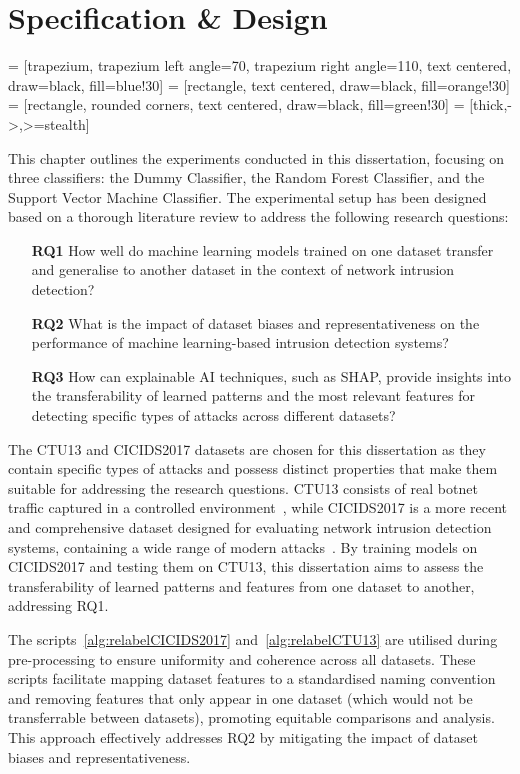 \chapter{Specification \& Design}\label{chap:specification-design}

 = [trapezium, trapezium left angle=70, trapezium right angle=110, text centered, draw=black, fill=blue!30]
 = [rectangle, text centered, draw=black, fill=orange!30]
 = [rectangle, rounded corners, text centered, draw=black, fill=green!30]
 = [thick,->,>=stealth]

This chapter outlines the experiments conducted in this dissertation, focusing on three classifiers: the Dummy Classifier, the Random Forest Classifier, and the Support Vector Machine Classifier. The experimental setup has been designed based on a thorough literature review to address the following research questions:

\begin{enumerate}
\item[\textbf{RQ1}] How well do machine learning models trained on one dataset transfer and generalise to another dataset in the context of network intrusion detection?
\item[\textbf{RQ2}] What is the impact of dataset biases and representativeness on the performance of machine learning-based intrusion detection systems?
\item[\textbf{RQ3}] How can explainable AI techniques, such as SHAP, provide insights into the transferability of learned patterns and the most relevant features for detecting specific types of attacks across different datasets?
\end{enumerate}

The CTU13 and CICIDS2017 datasets are chosen for this dissertation as they contain specific types of attacks and possess distinct properties that make them suitable for addressing the research questions. CTU13 consists of real botnet traffic captured in a controlled environment~\cite{garcia2014empirical}, while CICIDS2017 is a more recent and comprehensive dataset designed for evaluating network intrusion detection systems, containing a wide range of modern attacks~\cite{sharafaldin2018toward}. By training models on CICIDS2017 and testing them on CTU13, this dissertation aims to assess the transferability of learned patterns and features from one dataset to another, addressing RQ1.

The scripts~\ref{alg:relabelCICIDS2017} and~\ref{alg:relabelCTU13} are utilised during pre-processing to ensure uniformity and coherence across all datasets. These scripts facilitate mapping dataset features to a standardised naming convention and removing features that only appear in one dataset (which would not be transferrable between datasets), promoting equitable comparisons and analysis. This approach effectively addresses RQ2 by mitigating the impact of dataset biases and representativeness.

